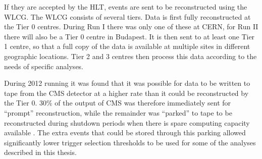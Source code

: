 If they are accepted by the \ac{HLT}, events are sent to be reconstructed using the \ac{WLCG}. The \ac{WLCG} consists of several tiers. Data is first fully reconstructed at the Tier 0 centres. During Run I there was only one of these at CERN, for Run II there will also be a Tier 0 centre in Budapest. It is then sent to at least one Tier 1 centre, so that a full copy of the data is available at multiple sites in different geographic locations. Tier 2 and 3 centres then process this data according to the needs of specific analyses.

During 2012 running it was found that it was possible for data to be written to tape from the CMS detector at a higher rate than it could be reconstructed by the Tier 0. 30\% of the output of CMS was therefore immediately sent for ``prompt'' reconstruction, while the remainder was ``parked'' to tape to be reconstructed during \LHC shutdown periods when there is spare computing capacity available \cite{CMS-DP-2012-022}. The extra events that could be stored through this parking allowed significantly lower trigger selection thresholds to be used for some of the analyses described in this thesis.


